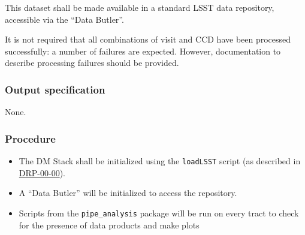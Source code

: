 This dataset shall be made available in a standard LSST data repository,
accessible via the ``Data Butler''.

It is not required that all combinations of visit and CCD have been processed
successfully: a number of failures are expected. However, documentation to
describe processing failures should be provided.

\subsubsection{Output specification}

None.

\subsubsection{Procedure}

\begin{itemize}

  \item{The DM Stack shall be initialized using the \texttt{loadLSST} script
  (as described in \hyperref[drp-00-00]{DRP-00-00}).}

  \item{A ``Data Butler'' will be initialized to access the repository.}

  \item{Scripts from the \texttt{pipe\_analysis} package will be run on every tract to check for the presence of data products and make plots}

\end{itemize}
